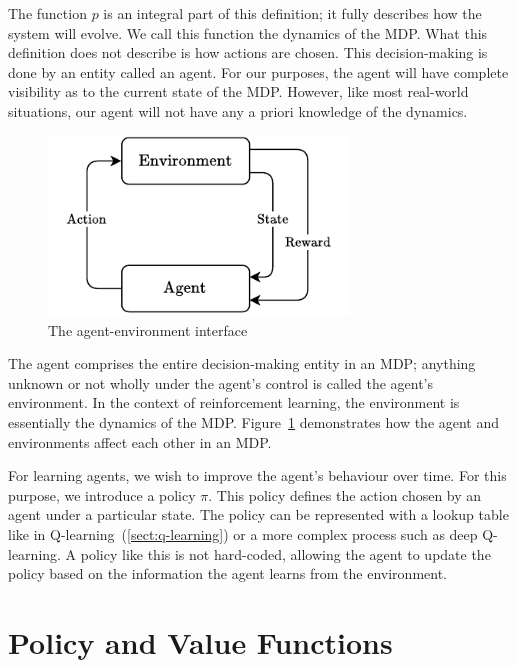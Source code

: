 \documentclass[]{final_report}
\begin{document}
The function $p$ is an integral part of this definition; it fully describes how the system will evolve. We call this function the dynamics of the MDP. What this definition does not describe is how actions are chosen. This decision-making is done by an entity called an agent. For our purposes, the agent will have complete visibility as to the current state of the MDP. However, like most real-world situations, our agent will not have any a priori knowledge of the dynamics. 

\begin{figure}[H]
  \centering
  
  \includegraphics[width=8cm]{agent-enviroment-2}
  
  \caption{\label{fig:agent-enviroment} The agent-environment interface}
\end{figure}

The agent comprises the entire decision-making entity in an MDP; anything unknown or not wholly under the agent's control is called the agent's environment. In the context of reinforcement learning, the environment is essentially the dynamics of the MDP. Figure~\ref{fig:agent-enviroment} demonstrates how the agent and environments affect each other in an MDP. 

\label{policy-informal-definition}
For learning agents, we wish to improve the agent's behaviour over time. For this purpose, we introduce a policy $\pi$. This policy defines the action chosen by an agent under a particular state. The policy can be represented with a lookup table like in Q-learning~(\ref{sect:q-learning}) or a more complex process such as deep Q-learning. A policy like this is not hard-coded, allowing the agent to update the policy based on the information the agent learns from the environment. 


\section{Policy and Value Functions}
\end{document}
